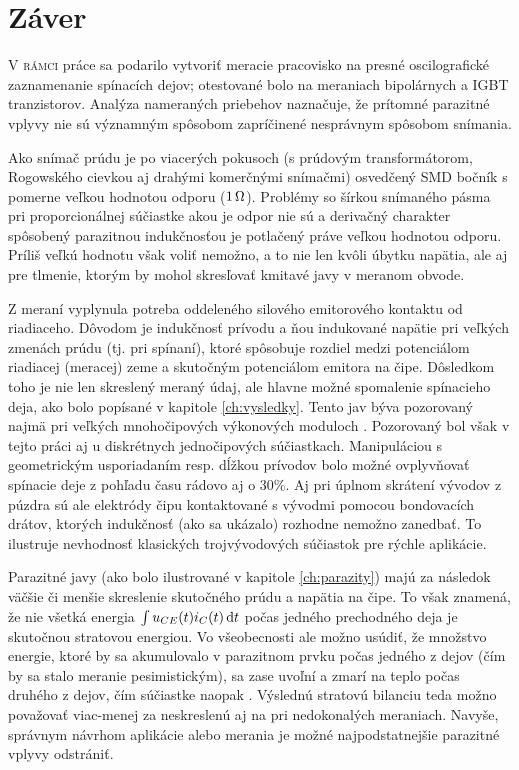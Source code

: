 \chapter*{Záver} \label{ch_zaver} 


\lettrine{V}{ rámci} práce sa podarilo vytvoriť meracie pracovisko na presné oscilografické zaznamenanie spínacích dejov; otestované bolo na meraniach bipolárnych a IGBT tranzistorov. Analýza nameraných priebehov naznačuje, že prítomné parazitné vplyvy nie sú významným spôsobom zapríčinené nesprávnym spôsobom snímania.

Ako snímač prúdu je po viacerých pokusoch (s prúdovým transformátorom, Rogowského cievkou aj drahými komerčnými snímačmi) osvedčený SMD bočník s pomerne veľkou hodnotou odporu ($1\, \mathrm{\Omega}$). Problémy so šírkou snímaného pásma pri proporcionálnej súčiastke akou je odpor nie sú a derivačný charakter spôsobený parazitnou indukčnosťou je potlačený práve veľkou hodnotou odporu. Príliš veľkú hodnotu však voliť nemožno, a to nie len kvôli úbytku napätia, ale aj pre tlmenie, ktorým by mohol skresľovať kmitavé javy v meranom obvode.

Z meraní vyplynula potreba oddeleného silového emitorového kontaktu od riadiaceho. Dôvodom je indukčnosť prívodu a ňou indukované napätie pri veľkých zmenách prúdu (tj. pri spínaní), ktoré spôsobuje rozdiel medzi potenciálom riadiacej (meracej) zeme a skutočným potenciálom emitora na čipe. Dôsledkom toho je nie len skreslený meraný údaj, ale hlavne možné spomalenie spínacieho deja, ako bolo popísané v kapitole \ref{ch:vysledky}. Tento jav býva pozorovaný najmä pri veľkých mnohočipových výkonových moduloch \cite{khanna}. Pozorovaný bol však v tejto práci aj u diskrétnych jednočipových súčiastkach. Manipuláciou s geometrickým usporiadaním resp. dĺžkou prívodov bolo možné ovplyvňovať spínacie deje z pohľadu času rádovo aj o $30\%$. Aj pri úplnom skrátení vývodov z púzdra sú ale elektródy čipu kontaktované s vývodmi pomocou bondovacích drátov, ktorých indukčnosť (ako sa ukázalo) rozhodne nemožno zanedbať. To ilustruje nevhodnosť klasických trojvývodových súčiastok pre rýchle aplikácie.

Parazitné javy (ako bolo ilustrované v kapitole \ref{ch:parazity}) majú za následok väčšie či menšie skreslenie skutočného prúdu a napätia na čipe. To však znamená, že nie všetká energia $\int u_{CE}(t) i_C(t) \, \mathrm{d} t$ počas jedného prechodného deja je skutočnou stratovou energiou. Vo všeobecnosti ale možno usúdiť, že množstvo energie, ktoré by sa akumulovalo v parazitnom prvku počas jedného z dejov (čím by sa stalo meranie pesimistickým), sa zase uvoľní a zmarí na teplo počas druhého z dejov, čím súčiastke naopak . Výslednú stratovú bilanciu teda možno považovať viac-menej za neskreslenú aj na pri nedokonalých meraniach.
Navyše, správnym návrhom aplikácie alebo merania je možné najpodstatnejšie parazitné vplyvy odstrániť.

